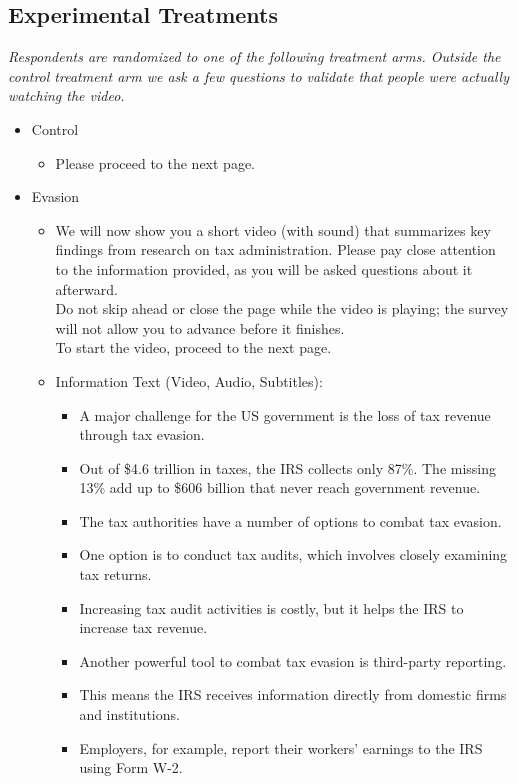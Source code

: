\documentclass[11pt]{article}
\begin{document}
\subsection*{Experimental Treatments}
\textit{Respondents are randomized to one of the following treatment arms. Outside the control treatment arm we ask a few questions to validate that people were actually watching the video.}
\begin{itemize}
    \item Control
    \begin{itemize}
        \item Please proceed to the next page. 
    \end{itemize}
    \item Evasion
    \begin{itemize}
        \item We will now show you a short video (with sound) that summarizes key findings from research on tax administration. Please pay close attention to the information provided, as you will be asked questions about it afterward. \\[0.5em] Do not skip ahead or close the page while the video is playing; the survey will not allow you to advance before it finishes.\\To start the video, proceed to the next page.
        \item Information Text (Video, Audio, Subtitles): 
        \begin{itemize}
            \item A major challenge for the US government is the loss of tax revenue through tax evasion.
            \item Out of \$4.6 trillion in taxes, the IRS collects only 87\%. The missing 13\% add up to \$606 billion that never reach government revenue. 
            \item The tax authorities have a number of options to combat tax evasion.
            \item One option is to conduct tax audits, which involves closely examining tax returns.
            \item Increasing tax audit activities is costly, but it helps the IRS to increase tax revenue.
            \item Another powerful tool to combat tax evasion is third-party reporting. 
            \item This means the IRS receives information directly from domestic firms and institutions.
            \item Employers, for example, report their workers’ earnings to the IRS using Form W-2.

\end{itemize}
\end{itemize}
\end{itemize}
\end{document}
